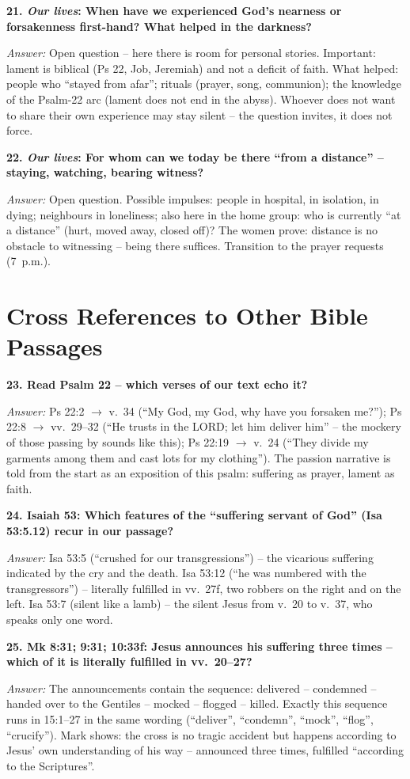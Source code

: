 \documentclass[12pt,a4paper]{article}
\newcommand{\frage}[1]{\par\vspace{0.7em}\noindent\textbf{#1}\par}
\newcommand{\antwort}[1]{\par\noindent\textit{Answer:} #1\par}
\begin{document}
\frage{21. \emph{Our lives}: When have we experienced God's nearness or forsakenness first-hand? What helped in the darkness?}
\antwort{Open question -- here there is room for personal stories. Important: lament is biblical (Ps 22, Job, Jeremiah) and not a deficit of faith. What helped: people who ``stayed from afar''; rituals (prayer, song, communion); the knowledge of the Psalm-22 arc (lament does not end in the abyss). Whoever does not want to share their own experience may stay silent -- the question invites, it does not force.}

\frage{22. \emph{Our lives}: For whom can we today be there ``from a distance'' -- staying, watching, bearing witness?}
\antwort{Open question. Possible impulses: people in hospital, in isolation, in dying; neighbours in loneliness; also here in the home group: who is currently ``at a distance'' (hurt, moved away, closed off)? The women prove: distance is no obstacle to witnessing -- being there suffices. Transition to the prayer requests (7~p.m.).}

\section*{Cross References to Other Bible Passages}

\frage{23. Read Psalm 22 -- which verses of our text echo it?}
\antwort{Ps 22:2 $\to$ v.~34 (``My God, my God, why have you forsaken me?''); Ps 22:8 $\to$ vv.~29--32 (``He trusts in the LORD; let him deliver him'' -- the mockery of those passing by sounds like this); Ps 22:19 $\to$ v.~24 (``They divide my garments among them and cast lots for my clothing''). The passion narrative is told from the start as an exposition of this psalm: suffering as prayer, lament as faith.}

\frage{24. Isaiah 53: Which features of the ``suffering servant of God'' (Isa 53:5.12) recur in our passage?}
\antwort{Isa 53:5 (``crushed for our transgressions'') -- the vicarious suffering indicated by the cry and the death. Isa 53:12 (``he was numbered with the transgressors'') -- literally fulfilled in vv.~27f, two robbers on the right and on the left. Isa 53:7 (silent like a lamb) -- the silent Jesus from v.~20 to v.~37, who speaks only one word.}

\frage{25. Mk 8:31; 9:31; 10:33f: Jesus announces his suffering three times -- which of it is literally fulfilled in vv.~20--27?}
\antwort{The announcements contain the sequence: delivered -- condemned -- handed over to the Gentiles -- mocked -- flogged -- killed. Exactly this sequence runs in 15:1--27 in the same wording (``deliver'', ``condemn'', ``mock'', ``flog'', ``crucify''). Mark shows: the cross is no tragic accident but happens according to Jesus' own understanding of his way -- announced three times, fulfilled ``according to the Scriptures''.}
\end{document}
